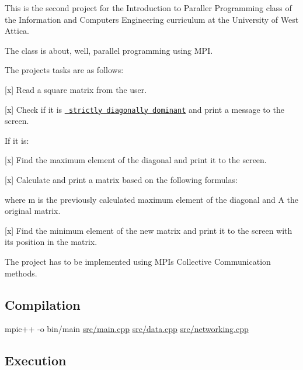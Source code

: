 This is the second project for the Introduction to Paraller Programming class of the Information and Computers Engineering curriculum at the University of West Attica.

The class is about, well, parallel programming using M\+PI.

The project\textquotesingle{}s tasks are as follows\+:


\begin{DoxyItemize}
\item \mbox{[}x\mbox{]} Read a square matrix from the user.
\item \mbox{[}x\mbox{]} Check if it is \href{https://en.wikipedia.org/wiki/Diagonally_dominant_matrix}{\texttt{ strictly diagonally dominant}} and print a message to the screen.
\end{DoxyItemize}

If it is\+:


\begin{DoxyItemize}
\item \mbox{[}x\mbox{]} Find the maximum element of the diagonal and print it to the screen.
\item \mbox{[}x\mbox{]} Calculate and print a matrix based on the following formulas\+:
\end{DoxyItemize}

 

 

where {\ttfamily m} is the previously calculated maximum element of the diagonal and {\ttfamily A} the original matrix.


\begin{DoxyItemize}
\item \mbox{[}x\mbox{]} Find the minimum element of the new matrix and print it to the screen with it\textquotesingle{}s position in the matrix.
\end{DoxyItemize}

The project has to be implemented using M\+PI\textquotesingle{}s Collective Communication methods.

\subsection*{Compilation}

{\ttfamily mpic++ -\/o bin/main \mbox{\hyperlink{main_8cpp}{src/main.\+cpp}} \mbox{\hyperlink{data_8cpp}{src/data.\+cpp}} \mbox{\hyperlink{networking_8cpp}{src/networking.\+cpp}}}

\subsection*{Execution}

